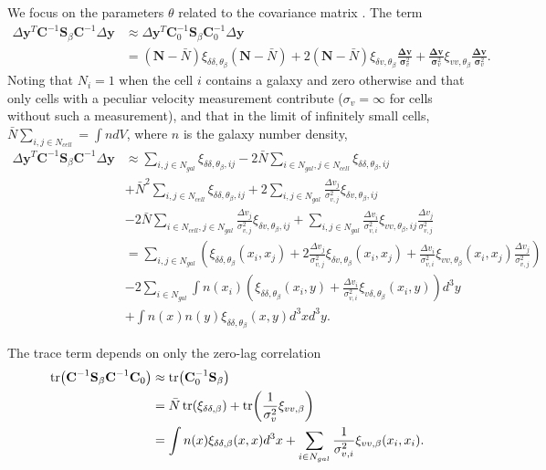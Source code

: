 \documentclass{article}
\begin{document}
We focus on the parameters $\theta$ related to the covariance matrix .
The term
\begin{align}
\Delta \textbf{y}^T \textbf{C}^{-1} \textbf{S}_\beta \textbf{C}^{-1} \Delta \textbf{y} & \approx \Delta \textbf{y}^T \textbf{C}_0^{-1} \textbf{S}_\beta \textbf{C}_0^{-1} \Delta \textbf{y}\\
&=(\textbf{N}-\bar{N}) \xi_{\delta\delta,\theta_\beta}  (\textbf{N}-\bar{N})  + 2  (\textbf{N}-\bar{N}) \xi_{\delta v,\theta_\beta}\frac{\mathbf{\Delta v}}{\bm{\sigma}_v^2}+ 
\frac{\mathbf{\Delta v}}{\bm{\sigma}_v^2} \xi_{vv,\theta_\beta}\frac{\mathbf{\Delta v}}{\bm{\sigma}_v^2}.
\end{align}
Noting that $N_i=1$ when the cell $i$ contains a galaxy and zero otherwise and that only cells with a peculiar velocity measurement contribute ($\sigma_v =\infty$
for cells without such a measurement), and that in the limit of infinitely small cells, $\bar{N}\sum_{i,j\in N_{cell}} = \int n dV$, where $n$ is the galaxy number density,
\begin{align*}
\Delta \textbf{y}^T \textbf{C}^{-1} \textbf{S}_\beta \textbf{C}^{-1} \Delta \textbf{y} & \approx \sum_{i,j\in N_{gal}} \xi_{\delta\delta,\theta_\beta,ij} -2 \bar{N} \sum_{i\in N_{gal},j\in N_{cell}} \xi_{\delta\delta,\theta_\beta,ij}\\
& +\bar{N}^2  \sum_{i,j\in N_{cell}}  \xi_{\delta\delta,\theta_\beta,ij} + 2 \sum_{i,j\in N_{gal}} \frac{\Delta v_j}{\sigma_{v,j}^2} \xi_{\delta v,\theta_\beta,ij} \\
& -2\bar{N}\sum_{i\in N_{cell}, j\in N_{gal}} \frac{\Delta v_j}{\sigma_{v,j}^2} \xi_{\delta v,\theta_\beta,ij}  + \sum_{i,j\in N_{gal}} \frac{\Delta v_i}{\sigma_{v,i}^2} \xi_{vv,\theta_\beta,ij} \frac{\Delta v_j}{\sigma_{v,j}^2}\\
& = \sum_{i,j\in N_{gal}} \left( \xi_{\delta\delta,\theta_\beta}(x_i,x_j) + 2  \frac{\Delta v_j}{\sigma_{v,j}^2} \xi_{\delta v,\theta_\beta}(x_i,x_j) + \frac{\Delta v_i}{\sigma_{v,i}^2} \xi_{vv,\theta_\beta}(x_i,x_j) \frac{\Delta v_j}{\sigma_{v,j}^2}\right)\\
&-2  \sum_{i\in N_{gal}}\int n(x_i) \left(\xi_{\delta\delta,\theta_\beta}(x_i,y) + \frac{\Delta v_i}{\sigma_{v,i}^2} \xi_{v \delta,\theta_\beta}(x_i,y) \right) d^3y\\
&  + \int n(x) n(y) \xi_{\delta\delta,\theta_\beta}(x,y)d^3xd^3y.
\end{align*}

The trace term depends on only the zero-lag correlation
\begin{align}
 \tr(\textbf{C}^{-1} \textbf{S}_\beta \textbf{C}^{-1} \textbf{C}_0) & \approx  \tr(\textbf{C}_0^{-1} \textbf{S}_\beta) \\
 & = \bar{N} \tr(\xi_{\delta\delta,\beta}) + \tr(\frac{1}{\sigma^2_v} \xi_{vv,\beta})\\
 & = \int n(x) \xi_{\delta \delta,\beta}(x,x) d^3x +  \sum_{i\in N_{gal}} \frac{1}{\sigma^2_{v,i}} \xi_{vv,\beta}(x_i,x_i).
\end{align}
\end{document}
